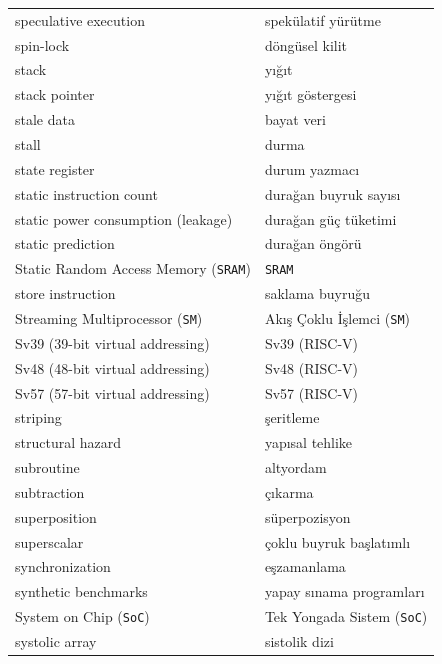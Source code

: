 {\begin{longtable}{@{}p{7.6cm}p{7.6cm}@{}}
speculative execution & spekülatif yürütme \\
spin-lock & döngüsel kilit \\
stack & yığıt \\
stack pointer & yığıt göstergesi \\
stale data & bayat veri \\
stall & durma \\
state register & durum yazmacı \\
static instruction count & durağan buyruk sayısı \\
static power consumption (leakage) & durağan güç tüketimi \\
static prediction & durağan öngörü \\
Static Random Access Memory (\texttt{SRAM}) & \texttt{SRAM} \\
store instruction & saklama buyruğu \\
Streaming Multiprocessor (\texttt{SM}) & Akış Çoklu İşlemci (\texttt{SM}) \\
Sv39 (39-bit virtual addressing) & Sv39 (RISC-V) \\
Sv48 (48-bit virtual addressing) & Sv48 (RISC-V) \\
Sv57 (57-bit virtual addressing) & Sv57 (RISC-V) \\
striping & şeritleme \\
structural hazard & yapısal tehlike \\
subroutine & altyordam \\
subtraction & çıkarma \\
superposition & süperpozisyon \\
superscalar & çoklu buyruk başlatımlı \\
synchronization & eşzamanlama \\
synthetic benchmarks & yapay sınama programları \\
System on Chip (\texttt{SoC}) & Tek Yongada Sistem (\texttt{SoC}) \\
systolic array & sistolik dizi \\


\end{longtable}}
